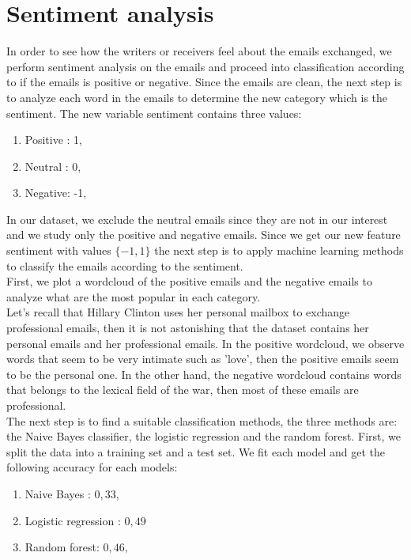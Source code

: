 \documentclass[11pt]{article}
\begin{document}
\section{Sentiment analysis}

In order to see how the writers or receivers feel about the emails exchanged, we perform sentiment analysis on the emails and proceed into classification according to if the emails is positive or negative. Since the emails are clean, the next step is to analyze each word in the emails to determine the new category which is the sentiment. The new variable sentiment contains three values:

\begin{enumerate}
    \item Positive : 1,
    \item Neutral : 0,
    \item Negative: -1,
\end{enumerate}

In our dataset, we exclude the neutral emails since they are not in our interest and we study only the positive and negative emails. Since we get our new feature sentiment with values $\{-1,1\}$ the next step is to apply machine learning methods to classify the emails according to the sentiment.\\

First, we plot a wordcloud of the positive emails and the negative emails to analyze what are the most popular in each category.\\

Let's recall that Hillary Clinton uses her personal mailbox to exchange professional emails, then it is not astonishing that the dataset contains her personal emails and her professional emails. In the positive wordcloud, we observe words that seem to be very intimate such as 'love', then the positive emails seem to be the personal one. In the other hand, the negative wordcloud contains words that belongs to the lexical field of the war, then most of these emails are professional.\\

The next step is to find a suitable classification methods, the three methods are: the Naive Bayes classifier, the logistic regression and the random forest. First, we split the data into a training set and a test set. We fit each model and get the following accuracy for each models:

\begin{enumerate}
    \item Naive Bayes : $0,33,$
    \item Logistic regression : $0,49$ 
    \item Random forest: $0,46,$
\end{enumerate}
\end{document}
